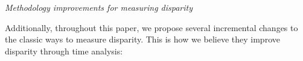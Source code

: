 \documentclass[12pt,letterpaper]{article}
\renewcommand{\subsection}[1]{%
\bigskip
\begin{center}
\begin{large}
\normalfont\itshape #1
\end{large}
\end{center}}
\begin{document}

\subsection{Methodology improvements for measuring disparity}
Additionally, throughout this paper, we propose several incremental changes to the classic ways to measure disparity.
This is how we believe they improve disparity through time analysis:
\end{document}
